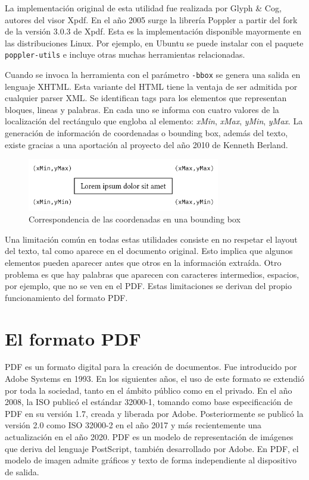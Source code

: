 La implementación original de esta utilidad fue realizada por Glyph \& Cog, autores del visor Xpdf. En el año 2005 surge la librería Poppler a partir del fork de la versión 3.0.3 de Xpdf. Esta es la implementación disponible mayormente en las distribuciones Linux. Por ejemplo, en Ubuntu se puede instalar con el paquete \verb|poppler-utils| e incluye otras muchas herramientas relacionadas.

Cuando se invoca la herramienta con el parámetro \verb|-bbox| se genera una salida en lenguaje XHTML. Esta variante del HTML tiene la ventaja de ser admitida por cualquier parser XML. Se identifican tags para los elementos que representan bloques, lineas y palabras. En cada uno se informa con cuatro valores de la localización del rectángulo que engloba al elemento: \emph{xMin}, \emph{xMax}, \emph{yMin}, \emph{yMax}. La generación de información de coordenadas o bounding box, además del texto, existe gracias a una aportación al proyecto del año 2010 de Kenneth Berland. 

\begin{figure}[hp!]
    \centering
    \includegraphics[width=0.75\textwidth]{imaxes/c-bases-teoricas/correspondencia-coordenadas-bounding.png}
    \caption{Correspondencia de las coordenadas en una bounding box}
    \label{fig:bounding-box}
\end{figure}

Una limitación común en todas estas utilidades consiste en no respetar el layout del texto, tal como aparece en el documento original. Esto implica que algunos elementos pueden aparecer antes que otros en la información extraída. Otro problema es que hay palabras que aparecen con caracteres intermedios, espacios, por ejemplo, que no se ven en el PDF. Estas limitaciones se derivan del propio funcionamiento del formato PDF.

\section{El formato PDF}

PDF es un formato digital para la creación de documentos. Fue introducido por Adobe Systems en 1993. En los siguientes años, el uso de este formato se extendió por toda la sociedad, tanto en el ámbito público como en el privado. En el año 2008, la ISO publicó el estándar 32000-1, tomando como base especificación de PDF en su versión 1.7, creada y liberada por Adobe. Posteriormente se publicó la versión 2.0 como ISO 32000-2 en el año 2017 y más recientemente una actualización en el año 2020. PDF es un modelo de representación de imágenes que deriva del lenguaje PostScript, también desarrollado por Adobe. En PDF, el modelo de imagen admite gráficos y texto de forma independiente al dispositivo de salida.

